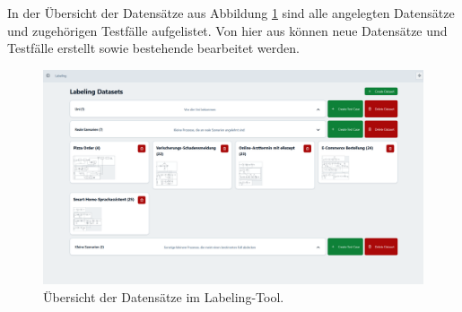 In der Übersicht der Datensätze aus Abbildung \ref{fig:labeling-datasets} sind alle angelegten Datensätze und zugehörigen Testfälle aufgelistet. Von hier aus können neue Datensätze und Testfälle erstellt sowie bestehende bearbeitet werden.

\begin{figure}
    \centering
    \includegraphics[width=\textwidth]{images/labeling/labeling-datasets}
    \caption{Übersicht der Datensätze im Labeling-Tool.}
    \label{fig:labeling-datasets}
\end{figure}